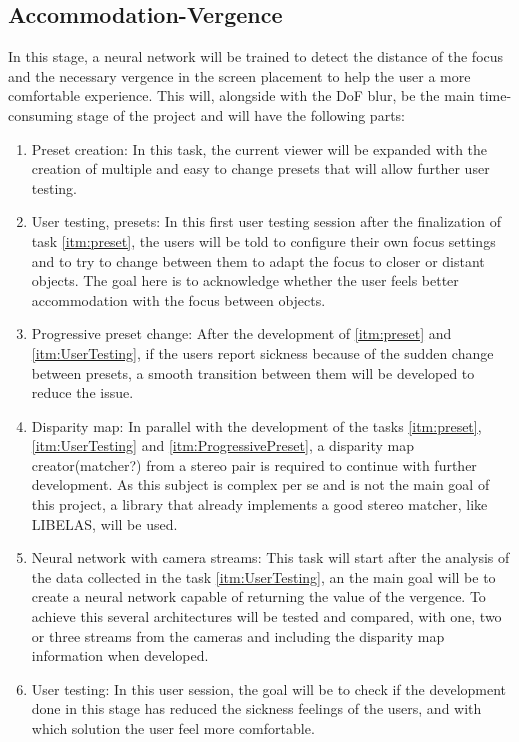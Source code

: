 \documentclass[10pt,a4paper,twocolumn,twoside]{article}
\begin{document}
	\subsection{Accommodation-Vergence}
	\label{subsec:vergence}
	In this stage, a neural network will be trained to detect the distance of the focus and the necessary vergence in the screen placement to help the user a more comfortable experience.
	This will, alongside with the DoF blur, be the main time-consuming stage of the project and will have the following parts:
	\begin{enumerate}
		\item \label{itm:preset}  Preset creation: In this task, the current viewer will be expanded with the creation of multiple and easy to change presets that will allow further user testing.
		
		\item \label{itm:UserTesting} User testing, presets: In this first user testing session after the finalization of task \ref{itm:preset}, the users will be told to configure their own focus settings and to try to change between them to adapt the focus to closer or distant objects. The goal here is to acknowledge whether the user feels better accommodation with the focus between objects.
		
		\item \label{itm:ProgressivePreset} Progressive preset change: After the development of \ref{itm:preset} and \ref{itm:UserTesting}, if the users report sickness because of the sudden change between presets, a smooth transition between them will be developed to reduce the issue. 
		
		\item Disparity map: In parallel with the development of the tasks \ref{itm:preset}, \ref{itm:UserTesting} and \ref{itm:ProgressivePreset}, a disparity map creator(matcher?) from a stereo pair is required to continue with further development. As this subject is complex per se and is not the main goal of this project, a library that already implements a good stereo matcher, like LIBELAS\cite{web:LIBELAS}, will be used. 
		
		\item Neural network with camera streams: This task will start after the analysis of the data collected in the task \ref{itm:UserTesting}, an the main goal will be to create a neural network capable of returning the value of the vergence. To achieve this several architectures will be tested and compared, with one, two or three streams from the cameras and including the disparity map information when developed.
		
		\item User testing: In this user session, the goal will be to check if the development done in this stage has reduced the sickness feelings of the users, and with which solution the user feel more comfortable.
	\end{enumerate}
	
\end{document}
